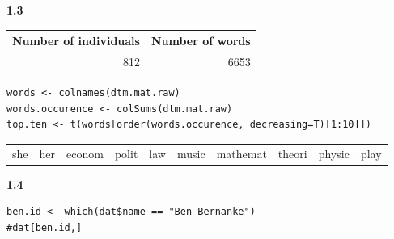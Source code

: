 \documentclass[11pt]{article}
\begin{document}
\textbf{1.3}

\begin{org}
\begin{center}
\begin{tabular}{rr}
Number of individuals & Number of words\\
\hline
812 & 6653\\
\end{tabular}
\end{center}
\end{org}





\begin{verbatim}
words <- colnames(dtm.mat.raw)
words.occurence <- colSums(dtm.mat.raw)
top.ten <- t(words[order(words.occurence, decreasing=T)[1:10]])
\end{verbatim}

\begin{org}
\begin{center}
\begin{tabular}{llllllllll}
she & her & econom & polit & law & music & mathemat & theori & physic & play\\
\end{tabular}
\end{center}
\end{org}




\textbf{1.4}

\begin{verbatim}
ben.id <- which(dat$name == "Ben Bernanke")
#dat[ben.id,]
\end{verbatim}
\end{document}
